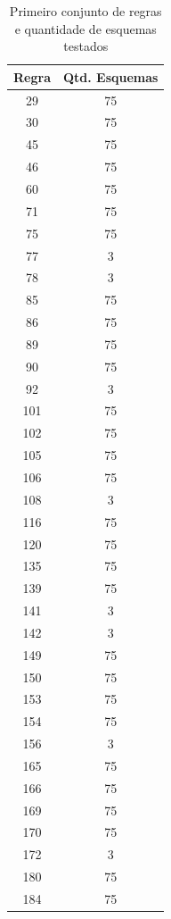 \documentclass[a4paper,12pt]{ltxdoc}
\begin{document}
\begin{center}
\begin{longtable}{ | c | c | } 
\caption{Primeiro conjunto de regras e quantidade de esquemas testados}\\
  \hline
 Regra & Qtd. Esquemas     \\\hline
  29 & 75  \\ \hline
  30 & 75  \\ \hline
  45 & 75  \\ \hline
  46 & 75  \\ \hline
  60 & 75  \\ \hline
  71 & 75  \\ \hline
  75 & 75  \\ \hline
  77 & 3   \\ \hline
  78 & 3   \\ \hline
  85 & 75  \\ \hline
  86 & 75  \\ \hline
  89 & 75  \\ \hline
  90 & 75  \\ \hline
  92 & 3   \\ \hline
  101 & 75 \\ \hline
  102 & 75 \\ \hline
  105 & 75 \\ \hline
  106 & 75 \\ \hline
  108 & 3  \\ \hline
  116 & 75 \\ \hline
  120 & 75 \\ \hline
  135 & 75 \\ \hline
  139 & 75 \\ \hline
  141 & 3  \\ \hline
  142 & 3  \\ \hline
  149 & 75 \\ \hline
  150 & 75 \\ \hline
  153 & 75 \\ \hline
  154 & 75 \\ \hline
  156 & 3  \\ \hline
  165 & 75 \\ \hline
  166 & 75 \\ \hline
  169 & 75 \\ \hline
  170 & 75 \\ \hline
  172 & 3  \\ \hline
  180 & 75 \\ \hline
  184 & 75 \\ \hline

\end{longtable}
\end{center}
\end{document}
